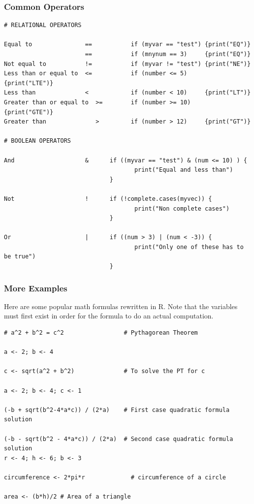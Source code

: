\documentclass{beamer}
\begin{document}

\begin{frame}[fragile]
\frametitle{Common Operators}
\scriptsize
\begin{verbatim}
# RELATIONAL OPERATORS

Equal to               ==           if (myvar == "test") {print("EQ")} 
                       ==           if (mnynum == 3)     {print("EQ")} 
Not equal to           !=           if (myvar != "test") {print("NE")} 
Less than or equal to  <=           if (number <= 5)     {print("LTE")}
Less than              <            if (number < 10)     {print("LT")}
Greater than or equal to  >=        if (number >= 10)    {print("GTE")}
Greater than              >         if (number > 12)     {print("GT")}

# BOOLEAN OPERATORS 

And                    &      if ((myvar == "test") & (num <= 10) ) { 
                                     print("Equal and less than")
                              }
                                     
Not                    !      if (!complete.cases(myvec)) {
                                     print("Non complete cases")
                              } 

Or                     |      if ((num > 3) | (num < -3)) {
                                     print("Only one of these has to be true")
                              }
\end{verbatim}
\end{frame}



\begin{frame}[fragile]
\frametitle{More Examples}
Here are some popular math formulas rewritten in R. Note that the variables must first exist in order for the formula to do an actual computation.
\scriptsize

\begin{verbatim}
# a^2 + b^2 = c^2                 # Pythagorean Theorem

a <- 2; b <- 4

c <- sqrt(a^2 + b^2)              # To solve the PT for c

a <- 2; b <- 4; c <- 1

(-b + sqrt(b^2-4*a*c)) / (2*a)    # First case quadratic formula solution

(-b - sqrt(b^2 - 4*a*c)) / (2*a)  # Second case quadratic formula solution
r <- 4; h <- 6; b <- 3

circumference <- 2*pi*r             # circumference of a circle

area <- (b*h)/2 # Area of a triangle  
\end{verbatim}
\end{frame}
\end{document}
